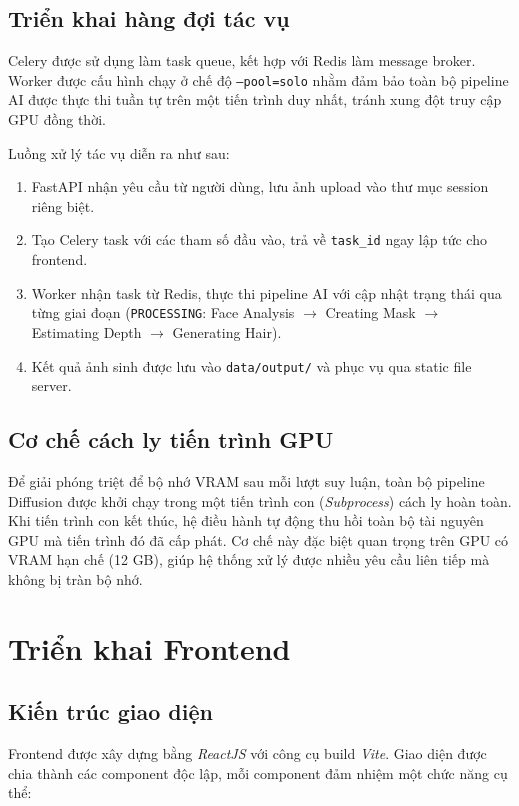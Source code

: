 \documentclass[../main.tex]{subfiles}
\begin{document}
\subsection{Triển khai hàng đợi tác vụ}
Celery được sử dụng làm task queue, kết hợp với Redis làm message broker. Worker được cấu hình chạy ở chế độ \texttt{--pool=solo} nhằm đảm bảo toàn bộ pipeline AI được thực thi tuần tự trên một tiến trình duy nhất, tránh xung đột truy cập GPU đồng thời.

Luồng xử lý tác vụ diễn ra như sau:
\begin{enumerate}
    \item FastAPI nhận yêu cầu từ người dùng, lưu ảnh upload vào thư mục session riêng biệt.
    \item Tạo Celery task với các tham số đầu vào, trả về \texttt{task\_id} ngay lập tức cho frontend.
    \item Worker nhận task từ Redis, thực thi pipeline AI với cập nhật trạng thái qua từng giai đoạn (\texttt{PROCESSING}: Face Analysis $\rightarrow$ Creating Mask $\rightarrow$ Estimating Depth $\rightarrow$ Generating Hair).
    \item Kết quả ảnh sinh được lưu vào \texttt{data/output/} và phục vụ qua static file server.
\end{enumerate}

\subsection{Cơ chế cách ly tiến trình GPU}
Để giải phóng triệt để bộ nhớ VRAM sau mỗi lượt suy luận, toàn bộ pipeline Diffusion được khởi chạy trong một tiến trình con (\textit{Subprocess}) cách ly hoàn toàn. Khi tiến trình con kết thúc, hệ điều hành tự động thu hồi toàn bộ tài nguyên GPU mà tiến trình đó đã cấp phát. Cơ chế này đặc biệt quan trọng trên GPU có VRAM hạn chế (12 GB), giúp hệ thống xử lý được nhiều yêu cầu liên tiếp mà không bị tràn bộ nhớ.

\section{Triển khai Frontend}

\subsection{Kiến trúc giao diện}
Frontend được xây dựng bằng \textit{ReactJS} với công cụ build \textit{Vite}. Giao diện được chia thành các component độc lập, mỗi component đảm nhiệm một chức năng cụ thể:
\end{document}
